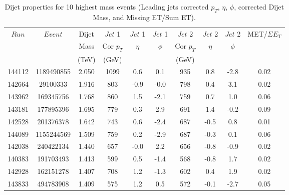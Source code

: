 \clearpage


\begin{table}[thb]
\centering
       \begin{tabular}{ |c|c||c|c|c|c|c|c|c|c| }
        \hline
        \multirow{2}{*}{$Run$} & \multirow{2}{*}{$Event$} & Dijet & $Jet$ 1   & $Jet$ 1 & $Jet$ 1  & $Jet$ 2 & $Jet$ 2 & $Jet$ 2 &  MET/$\Sigma E_T$\\
         & & Mass & Cor $p_T $ & $\eta$ & $\phi$  & Cor $p_T$ & $\eta$ & $\phi$ &  \\

          & & (TeV) & (GeV)  &  &  & (GeV) &  & &  \\
	\hline
	\hline	
	144112 & 1189490855 & 2.050 & 1099 & 0.6 & 0.1 & 935 & 0.8 & -2.8 & 0.02\\
	\hline
	142664 & 29100333 & 1.916 & 803 & -0.9 & -0.0 & 798 & 0.4 & 3.1 & 0.02\\
	\hline
	143962 & 169345756 & 1.768 & 860 & 1.5 & -2.1 & 759 & 0.7 & 1.0 & 0.06\\
	\hline
	143181 & 177895396 & 1.695 & 779 & 0.3 & 2.9 & 691 & 1.4 & -0.2 & 0.09\\
	\hline
	142528 & 201376378 & 1.642 & 743 & 0.6 & -2.4 & 687 & -0.5 & 0.8 & 0.01\\
	\hline
	144089 & 1155244569 & 1.509 & 759 & 0.2 & -2.9 & 687 & -0.3 & 0.1 & 0.06\\
	\hline
	142038 & 240422134 & 1.440 & 657 & -0.0 & 2.2 & 656 & -0.8 & -0.9 & 0.02\\
	\hline
	140383 & 191703493 & 1.413 & 599 & 0.5 & -1.4 & 568 & -0.8 & 1.7 &  0.02\\
	\hline
	142928 & 162151278 & 1.407 & 708 & 1.2 & -1.3 & 602 & 0.4 & 1.9 & 0.02\\
	\hline
	143833 & 494783908 & 1.409 & 575 & 1.2 & 0.5 & 572 & -0.1 & -2.7 & 0.05\\
	\hline

       \end{tabular}
       \caption{Dijet properties for 10 highest mass events (Leading jets corrected $p_T$, $\eta$, $\phi$, 
	 corrected Dijet Mass, and Missing ET/Sum ET).}
       \label{table_highmass2}
\end{table}
      
